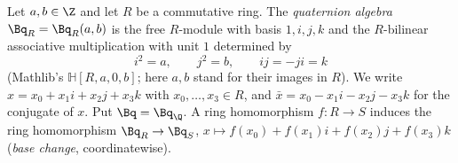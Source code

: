 Let $a,b\in\Z$ and let $R$ be a commutative ring. The \emph{quaternion algebra} $\Bq_R=\Bq_R(a,b)$ is the free $R$-module with basis
$1,i,j,k$ and the $R$-bilinear associative multiplication with unit $1$ determined by
\[
  i^2=a,\qquad j^2=b,\qquad ij=-ji=k
\]
(Mathlib's $\mathbb H[R,a,0,b]$; here $a,b$ stand for their images in $R$). We write $x=x_0+x_1i+x_2j+x_3k$ with $x_0,\dots,x_3\in R$, and
$\bar x=x_0-x_1i-x_2j-x_3k$ for the conjugate of $x$. Put $\Bq=\Bq_\Q$. A ring homomorphism $f\colon R\to S$ induces the ring homomorphism
$\Bq_R\to\Bq_S$, $x\mapsto f(x_0)+f(x_1)i+f(x_2)j+f(x_3)k$ (\emph{base change}, coordinatewise).
